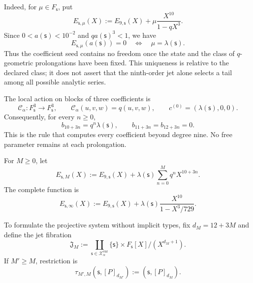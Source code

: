 Indeed, for \(\mu\in F_{\mathsf s}\), put
\[
 E_{\mathsf s,\mu}(X)
 :=E_{9,\mathsf s}(X)+\mu\frac{X^{10}}{1-qX^3}.
\]
Since \(0<a(\mathsf s)<10^{-2}\) and \(qa(\mathsf s)^3<1\), we have
\begin{equation}
 E_{\mathsf s,\mu}(a(\mathsf s))=0
 \quad\Longleftrightarrow\quad
 \mu=\lambda(\mathsf s).
 \label{eq:alpha-unicidad-lambda-clase-geometrica}
\end{equation}
Thus the coefficient seed contains no freedom once the state and the
class of \(q\)-geometric prolongations have been fixed. This uniqueness is relative to the
declared class; it does not assert that the ninth-order jet alone selects a
tail among all possible analytic series.

The local action on blocks of three coefficients is
\begin{equation}
 \mathcal C_\alpha:F_{\mathsf s}^{3}\longrightarrow F_{\mathsf s}^{3},
 \qquad \mathcal C_\alpha(u,v,w)=q(u,v,w),
 \qquad c^{(0)}=(\lambda(\mathsf s),0,0).
 \label{eq:alpha-accion-coeficientes}
\end{equation}
Consequently, for every \(n\geq0\),
\begin{equation}
 b_{10+3n}=q^n\lambda(\mathsf s),\qquad
 b_{11+3n}=b_{12+3n}=0.
 \label{eq:alpha-recurrencia-coeficientes}
\end{equation}
This is the rule that computes every coefficient beyond degree nine. No
free parameter remains at each prolongation.

For \(M\geq0\), let
\begin{equation}
 E_{\mathsf s,M}(X):=E_{9,\mathsf s}(X)
 +\lambda(\mathsf s)\sum_{n=0}^{M}q^nX^{10+3n}.
 \label{eq:alpha-truncamientos-completos}
\end{equation}
The complete function is
\begin{equation}
 E_{\mathsf s,\infty}(X)
 :=E_{9,\mathsf s}(X)
 +\lambda(\mathsf s)\frac{X^{10}}{1-X^3/729}.
 \label{eq:alpha-funcion-completa-explicita}
\end{equation}

To formulate the projective system without implicit types, fix
\(d_M=12+3M\) and define the jet fibration
\begin{equation}
 \mathfrak J_M:=
 \coprod_{\mathsf s\in\mathcal X_\alpha^{\mathrm{enr}}}
 \{\mathsf s\}\times F_{\mathsf s}[X]/(X^{d_M+1}).
 \label{eq:alpha-espacio-jets-rev08}
\end{equation}
If \(M'\ge M\), restriction is
\begin{equation}
 \tau_{M',M}(\mathsf s,[P]_{d_{M'}})
 :=(\mathsf s,[P]_{d_M}).
 \label{eq:alpha-truncamiento-jets-rev08}
\end{equation}

